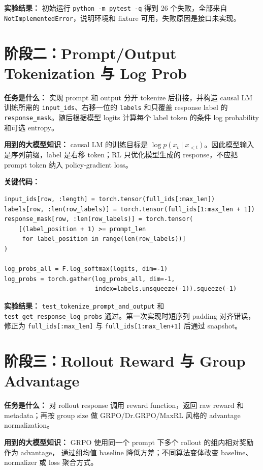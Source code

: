 \documentclass[UTF8]{ctexart}
\begin{document}
\textbf{实验结果：} 初始运行 \texttt{python -m pytest -q} 得到 26 个失败，全部来自
\texttt{NotImplementedError}，说明环境和 fixture 可用，失败原因是接口未实现。

\section{阶段二：Prompt/Output Tokenization 与 Log Prob}

\textbf{任务是什么：} 实现 prompt 和 output 分开 tokenize 后拼接，并构造 causal LM 训练所需的
\texttt{input\_ids}、右移一位的 \texttt{labels} 和只覆盖 response label 的
\texttt{response\_mask}。随后根据模型 logits 计算每个 label token 的条件 log probability 和可选
entropy。

\textbf{用到的大模型知识：} causal LM 的训练目标是
\(\log p(x_t \mid x_{<t})\)。因此模型输入是序列前缀，label 是右移 token；RL 只优化模型生成的
response，不应把 prompt token 纳入 policy-gradient loss。

\textbf{关键代码：}
\begin{verbatim}
input_ids[row, :length] = torch.tensor(full_ids[:max_len])
labels[row, :len(row_labels)] = torch.tensor(full_ids[1:max_len + 1])
response_mask[row, :len(row_labels)] = torch.tensor(
    [(label_position + 1) >= prompt_len
     for label_position in range(len(row_labels))]
)

log_probs_all = F.log_softmax(logits, dim=-1)
log_probs = torch.gather(log_probs_all, dim=-1,
                         index=labels.unsqueeze(-1)).squeeze(-1)
\end{verbatim}

\textbf{实验结果：} \texttt{test\_tokenize\_prompt\_and\_output} 和
\texttt{test\_get\_response\_log\_probs} 通过。第一次实现时短序列 padding 对齐错误，修正为
\texttt{full\_ids[:max\_len]} 与 \texttt{full\_ids[1:max\_len+1]} 后通过 snapshot。

\section{阶段三：Rollout Reward 与 Group Advantage}

\textbf{任务是什么：} 对 rollout response 调用 reward function，返回 raw reward 和
metadata；再按 group size 做 GRPO/Dr.GRPO/MaxRL 风格的 advantage normalization。

\textbf{用到的大模型知识：} GRPO 使用同一个 prompt 下多个 rollout 的组内相对奖励作为 advantage，
通过组均值 baseline 降低方差；不同算法变体改变 baseline、normalizer 或 loss 聚合方式。
\end{document}
